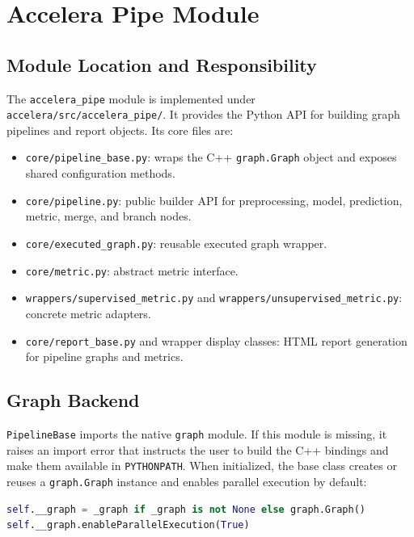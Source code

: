 \documentclass[11pt,a4paper]{article}
\newcommand{\modulepath}[1]{\texttt{#1}}
\begin{document}
\section{Accelera Pipe Module}

\subsection{Module Location and Responsibility}

The \texttt{accelera\_pipe} module is implemented under
\modulepath{accelera/src/accelera\_pipe/}. It provides the Python API for
building graph pipelines and report objects. Its core files are:

\begin{itemize}[leftmargin=*]
  \item \modulepath{core/pipeline\_base.py}: wraps the C++ \texttt{graph.Graph}
        object and exposes shared configuration methods.
  \item \modulepath{core/pipeline.py}: public builder API for preprocessing,
        model, prediction, metric, merge, and branch nodes.
  \item \modulepath{core/executed\_graph.py}: reusable executed graph wrapper.
  \item \modulepath{core/metric.py}: abstract metric interface.
  \item \modulepath{wrappers/supervised\_metric.py} and
        \modulepath{wrappers/unsupervised\_metric.py}: concrete metric
        adapters.
  \item \modulepath{core/report\_base.py} and wrapper display classes:
        HTML report generation for pipeline graphs and metrics.
\end{itemize}

\subsection{Graph Backend}

\texttt{PipelineBase} imports the native \texttt{graph} module. If this module
is missing, it raises an import error that instructs the user to build the C++
bindings and make them available in \texttt{PYTHONPATH}. When initialized, the
base class creates or reuses a \texttt{graph.Graph} instance and enables
parallel execution by default:

\begin{lstlisting}[language=Python]
self.__graph = _graph if _graph is not None else graph.Graph()
self.__graph.enableParallelExecution(True)
\end{lstlisting}
\end{document}
